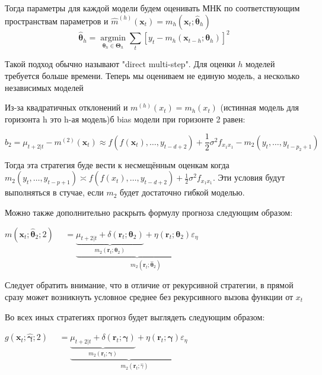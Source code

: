 \documentclass[a4paper,12pt]{article}
\begin{document}
Тогда параметры для каждой модели будем оценивать МНК по соответствующим пространствам параметров и $ \hat{m}^{(h)}\left(\boldsymbol{x}_{t}\right)=m_{h}\left(\boldsymbol{x}_{t} ; \hat{\boldsymbol{\theta}}_{h}\right) $
\[ \hat{\boldsymbol{\theta}}_{h}=\underset{\boldsymbol{\theta}_{h} \in \boldsymbol{\Theta}_{h}}{\operatorname{argmin}} \sum_{t}\left[y_{t}-m_{h}\left(\boldsymbol{x}_{t-h} ; \boldsymbol{\theta}_{h}\right)\right]^{2} \]

Такой подход обычно называют "direct multi-step". Для оценки $ h $ моделей требуется больше времени. Теперь мы оцениваем не единую модель, а несколько независимых моделей

Из-за квадратичных отклонений и $ m^{(h)}\left(x_{t}\right)=m_{h}\left(x_{t}\right) $ (истинная модель для горизонта h это h-ая модель)б bias модели при горизонте 2 равен:

\[ b_{2}=\mu_{t+2 | t}-m^{(2)}\left(\boldsymbol{x}_{t}\right) \approx f\left(f\left(\boldsymbol{x}_{t}\right), \ldots, y_{t-d+2}\right)+\frac{1}{2} \sigma^{2} f_{x_{1} x_{1}}-m_{2}\left(y_{t}, \ldots, y_{t-p_{2}+1}\right) \]

Тогда эта стратегия буде вести к несмещённым оценкам когда $m_{2}\left(y_{t}, \ldots, y_{t-p+1}\right) \asymp f\left(f\left(x_{t}\right), \ldots, y_{t-d+2}\right)+ \frac{1}{2} \sigma^{2} f_{x_{1} x_{1}}$. Эти условия будут выполняться в стучае, если $ m_2 $ будет достаточно гибкой моделью.

Можно также дополнительно раскрыть формулу прогноза следующим образом:

$m\left(\boldsymbol{x}_{t} ; \hat{\boldsymbol{\theta}}_{2} ; 2\right)$
$\quad=\underbrace{\underbrace{\mu_{t+2 | t}+\delta\left(\boldsymbol{r}_{t} ; \boldsymbol{\theta}_{2}\right)}_{m_{2}\left(\boldsymbol{r}_{t} ; \boldsymbol{\theta}_{2}\right)}+\eta\left(\boldsymbol{r}_{t} ; \boldsymbol{\theta}_{2}\right) \varepsilon_{\eta} }_{\quad \quad \quad m_{2}\left(\boldsymbol{r}_{t} ; \hat{\boldsymbol{\theta}}_{2}\right)}$

Следует обратить внимание, что в отличие от рекурсивной стратегии, в прямой сразу может возникнуть условное среднее без рекурсивного вызова функции от $ x_t $

Во всех иных стратегиях прогноз будет выглядеть следующим образом:

$g\left(\boldsymbol{x}_{t} ; \hat{\boldsymbol{\gamma}} ; 2\right)$
$\quad= \underbrace{\underbrace{\mu_{t+2 | t}+\delta\left(\boldsymbol{r}_{t} ; \boldsymbol{\gamma}\right)}_{m_{2}\left(\boldsymbol{r}_{t} ; \boldsymbol{\gamma}\right)}+\eta\left(\boldsymbol{r}_{t} ; \boldsymbol{\gamma}\right) \varepsilon_{\eta}}_{\quad \quad m_{2}\left(\boldsymbol{r}_{t} ; \hat{\gamma}\right)}$
\end{document}
